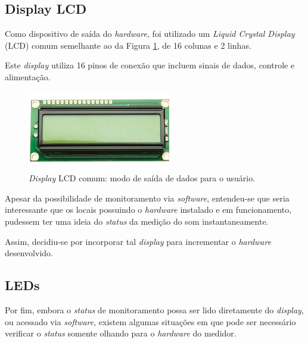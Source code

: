 \documentclass[
    12pt,               %
    openright,          %
    oneside,
    a4paper,            
    english,            %
    brazil              %
    ]{abntex2}
\begin{document}
\subsection{Display LCD}

Como dispositivo de saída do \textit{hardware}, foi utilizado um \textit{Liquid Crystal Display} (LCD) comum semelhante ao da Figura \ref{lcd}, de 16 colunas e 2 linhas. 

Este \textit{display} utiliza 16 pinos de conexão que incluem sinais de dados, controle e alimentação.

\begin{figure}[!htb]
  \begin{center}
    \caption{\label{lcd}\textit{Display} LCD comum: modo de saída de dados para o usuário.}
    \includegraphics[scale=0.45]{images/lcd.jpg}
  \end{center}
\end{figure}

Apesar da possibilidade de monitoramento via \textit{software}, entendeu-se que seria interessante que os locais possuindo o \textit{hardware} instalado e em funcionamento, pudessem ter uma ideia do \textit{status} da medição do som instantaneamente. 

Assim, decidiu-se por incorporar tal \textit{display} para incrementar o \textit{hardware} desenvolvido.

\subsection{LEDs}

Por fim, embora o \textit{status} de monitoramento possa ser lido diretamente do \textit{display}, ou acessado via \textit{software}, existem algumas situações em que pode ser necessário verificar o \textit{status} somente olhando para o \textit{hardware} do medidor.

\end{document}
